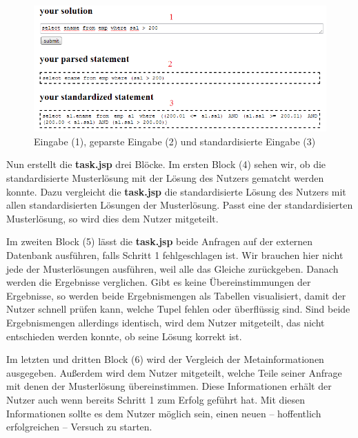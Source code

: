 \begin{figure}[H]
\centering
\includegraphics[scale=0.6]{Bilder/screen_prog1}
\caption{Eingabe (1), geparste Eingabe (2) und standardisierte Eingabe (3)}
\label{fig:screen_prog1}
\end{figure}

Nun erstellt die \textbf{task.jsp} drei Blöcke. Im ersten Block (4) sehen wir, ob die standardisierte Musterlösung mit der Lösung des Nutzers gematcht werden konnte. Dazu vergleicht die \textbf{task.jsp} die standardisierte Lösung des Nutzers mit allen standardisierten Lösungen der Musterlösung. Passt eine der standardisierten Musterlösung, so wird dies dem Nutzer mitgeteilt. 

Im zweiten Block (5) lässt die \textbf{task.jsp} beide Anfragen auf der externen Datenbank ausführen, falls Schritt 1 fehlgeschlagen ist. Wir brauchen hier nicht jede der Musterlösungen ausführen, weil alle das Gleiche zurückgeben. Danach werden die Ergebnisse verglichen. Gibt es keine Übereinstimmungen der Ergebnisse, so werden beide Ergebnismengen als Tabellen visualisiert, damit der Nutzer schnell prüfen kann, welche Tupel fehlen oder überflüssig sind. Sind beide Ergebnismengen allerdings identisch, wird dem Nutzer mitgeteilt, das nicht entschieden werden konnte, ob seine Lösung korrekt ist.

Im letzten und dritten Block (6) wird der Vergleich der Metainformationen ausgegeben. Außerdem wird dem Nutzer mitgeteilt, welche Teile seiner Anfrage mit denen der Musterlösung übereinstimmen. Diese Informationen erhält der Nutzer auch wenn bereits Schritt 1 zum Erfolg geführt hat. Mit diesen Informationen sollte es dem Nutzer möglich sein, einen neuen -- hoffentlich erfolgreichen -- Versuch zu starten.


